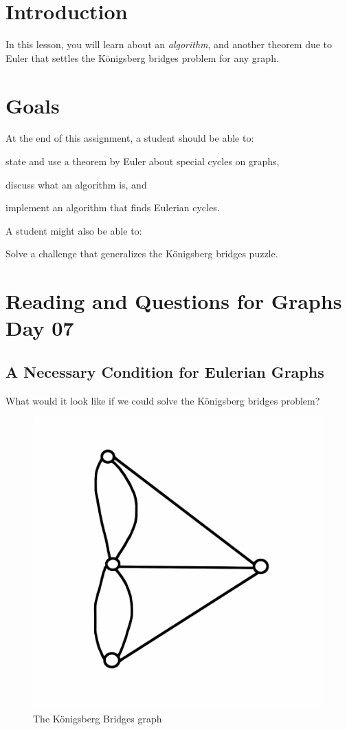 \documentclass[12pt,letterpaper]{article}
\theoremstyle{definition}
\begin{document}
\setlength{\parskip}{1ex plus 0.5ex minus 0.2ex}
\setlength{\parindent}{0pt}

\pagestyle{fancy}
\cfoot{}

\section*{Introduction}

In this lesson, you will learn about an \emph{algorithm}, and another theorem due to Euler that
settles the K\"{o}nigsberg bridges problem for any graph.

\section*{Goals}
At the end of this assignment, a student should be able to:
\begin{compactitem}
\item state and use a theorem by Euler about special cycles on graphs,
\item discuss what an algorithm is, and
\item implement an algorithm that finds Eulerian cycles.
\end{compactitem}
A student might also be able to:
\begin{compactitem}
\item Solve a challenge that generalizes the K\"{o}nigsberg bridges puzzle.
\end{compactitem}

\section*{Reading and Questions for Graphs Day 07}

\subsection*{A Necessary Condition for Eulerian Graphs}
What would it look like if we could solve the K\"{o}nigsberg bridges problem?

\begin{figure}[h]
\centering
\includegraphics[width=.3\textwidth]{images/konigsberg-graph.png}
\caption{The K\"{o}nigsberg Bridges graph}
\label{figure:konigsberg-graph}
\end{figure}
\end{document}
